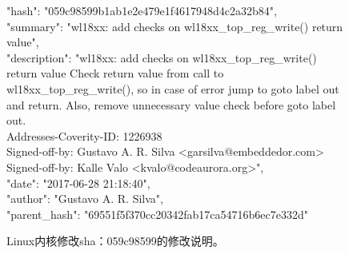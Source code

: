 \begin{figure}[b]
	\centering
	\begin{minipage}{0.75\linewidth}
{\footnotesize	
"hash": "059c98599b1ab1e2e479e1f4617948d4c2a32b84",\\
"summary": "wl18xx: add checks on wl18xx\_top\_reg\_write() return value",\\
"description": 
"wl18xx: add checks on wl18xx\_top\_reg\_write() return value
Check return value from call to wl18xx\_top\_reg\_write(),
so in case of error jump to goto label out and return.
Also, remove unnecessary value check before goto label out.\\
Addresses-Coverity-ID: 1226938\\
Signed-off-by: Gustavo A. R. Silva <garsilva@embeddedor.com>\\
Signed-off-by: Kalle Valo <kvalo@codeaurora.org>",\\
"date": "2017-06-28 21:18:40",\\
"author": "Gustavo A. R. Silva",\\
"parent\_hash": "69551f5f370cc20342fab17ca54716b6ec7e332d"	
}
	\end{minipage}
	\caption{
	Linux内核修改sha：059c98599的修改说明。
	}
	\label{fig:2-3-description}
\end{figure}
